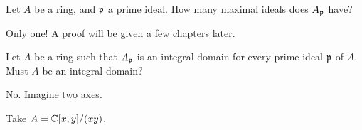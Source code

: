 \begin{sproblem}
	Let $A$ be a ring, and $\mathfrak p$ a prime ideal.
	How many maximal ideals does $A_\mathfrak p$ have?
	\begin{hint}
		Only one!
		A proof will be given a few chapters later.
	\end{hint}
\end{sproblem}


\begin{problem}
	Let $A$ be a ring such that $A_\mathfrak p$ is an integral domain
	for every prime ideal $\mathfrak p$ of $A$.
	Must $A$ be an integral domain?
	\begin{hint}
		No. Imagine two axes.
	\end{hint}
	\begin{sol}
		Take $A = \mathbb C[x,y] / (xy)$.
	\end{sol}
\end{problem}
